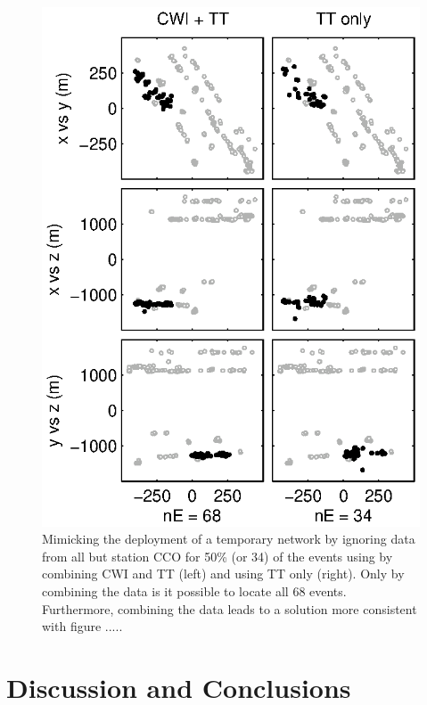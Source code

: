 \documentclass[extra]{gji}
\begin{document}
\begin{figure}
\includegraphics{diags/CalaverasLoc6_hypoDD_SVD.eps}
\caption{Mimicking the deployment of a temporary network by ignoring
data from all but station CCO for 50\% (or 34) of the events using
by combining CWI and TT (left) and using TT only (right). Only by
combining the data is it possible to locate all 68 events.
Furthermore, combining the data leads to a solution more consistent
with figure ..... } \label{fig-68Calaverasevents_ttsubsetandcoda1}
\end{figure}



\section{Discussion and Conclusions}
\end{document}
